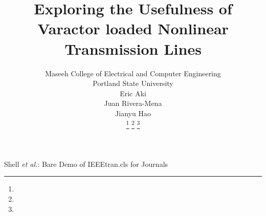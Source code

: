 \documentclass[journal]{IEEEtran}
\begin{document}
%
\title{Exploring the Usefulness of Varactor loaded Nonlinear Transmission Lines}
%
%
%

\author{Maseeh College of Electrical and Computer Engineering\\
Portland State University \\
Eric Aki\\
Juan Rivera-Mena\\
Jianyu Hao\\
\thanks{}%
\thanks{}%
\thanks{}}

% 
%



%
{Shell \MakeLowercase{\textit{et al.}}: Bare Demo of IEEEtran.cls for Journals}
% 
\end{document}

